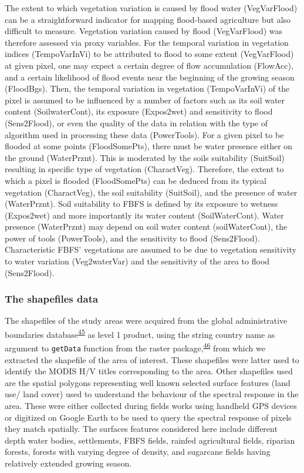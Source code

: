 \documentclass[12pt,oneside]{article}
\begin{document}
The extent to which vegetation variation is caused by flood water
(VegVarFlood) can be a straightforward indicator for mapping flood-based
agriculture but also difficult to measure. Vegetation variation caused
by flood (VegVarFlood) was therefore assessed via proxy variables. For
the temporal variation in vegetation indices (TempoVarInVi) to be
attributed to flood to some extent (VegVarFlood) at given pixel, one may
expect a certain degree of flow accumulation (FlowAcc), and a certain
likelihood of flood events near the beginning of the growing season
(FloodBgs). Then, the temporal variation in vegetation (TempoVarInVi) of
the pixel is assumed to be influenced by a number of factors such as its
soil water content (SoilwaterCont), its exposure (Expos2wet) and
sensitivity to flood (Sens2Flood), or even the quality of the data in
relation with the type of algorithm used in processing these data
(PowerTools). For a given pixel to be flooded at some points
(FloodSomePts), there must be water presence either on the ground
(WaterPrznt). This is moderated by the soils suitability (SuitSoil)
resulting in specific type of vegetation (CharactVeg). Therefore, the
extent to which a pixel is flooded (FloodSomePts) can be deduced from
its typical vegetation (CharactVeg), the soil suitability (SuitSoil),
and the presence of water (WaterPrznt). Soil suitability to FBFS is
defined by its exposure to wetness (Expos2wet) and more importantly its
water content (SoilWaterCont). Water presence (WaterPrznt) may depend on
soil water content (soilWaterCont), the power of tools (PowerTools), and
the sensitivity to flood (Sens2Flood). Characteristic FBFS' vegetations
are assumed to be due to vegetation sensitivity to water variation
(Veg2waterVar) and the sensitivity of the area to flood (Sens2Flood).

\hypertarget{I.3.2}{%
\subsubsection{The shapefiles data}\label{I.3.2}}

The shapefiles of the study areas were acquired from the global
administrative boundaries
database\textsuperscript{\protect\hyperlink{ref-GADM_2018}{45}} as level
1 product, using the string country name as argument to \texttt{getData}
function from the raster
package,\textsuperscript{\protect\hyperlink{ref-Hijmans_2019}{46}} from
which we extracted the shapefile of the area of interest. These
shapefiles were latter used to identify the MODIS H/V titles
corresponding to the area. Other shapefiles used are the spatial
polygons representing well known selected surface features (land use/
land cover) used to understand the behaviour of the spectral response in
the area. These were either collected during fields works using handheld
GPS devices or digitized on Google Earth to be used to query the
spectral response of pixels they match spatially. The surfaces features
considered here include different depth water bodies, settlements, FBFS
fields, rainfed agricultural fields, riparian forests, forests with
varying degree of density, and sugarcane fields having relatively
extended growing season.
\end{document}
